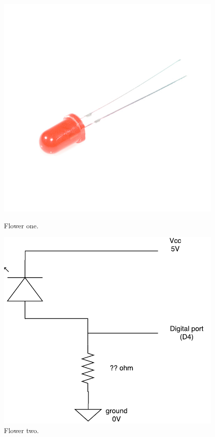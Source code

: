 \begin{figure}[h]
	\centering
	\begin{minipage}[b]{0.4\textwidth}
		\includegraphics[width=\textwidth]{img/hardware/led.jpg}
		\caption{Flower one.}
	\end{minipage}
	\hfill
	\begin{minipage}[b]{0.4\textwidth}
		\includegraphics[width=\textwidth]{img/hardware/led_esquema.pdf}
		\caption{Flower two.}
	\end{minipage}
\end{figure}




